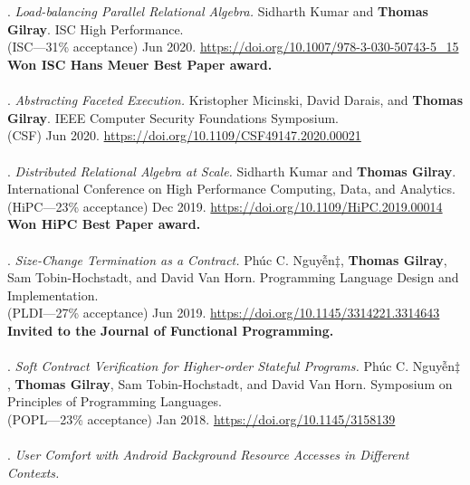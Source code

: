 \\ \vspace{-0.1cm}\\
\paper. \textit{Load-balancing Parallel Relational Algebra.}
Sidharth Kumar and \textbf{Thomas Gilray}.
ISC High Performance.
\\(ISC---31\% acceptance) Jun 2020. \url{https://doi.org/10.1007/978-3-030-50743-5_15}
\\\textbf{Won ISC Hans Meuer Best Paper award.} \\ \vspace{-0.1cm}\\
\paper. \textit{Abstracting Faceted Execution.}
Kristopher Micinski, David Darais, and \textbf{Thomas Gilray}.
IEEE Computer Security Foundations Symposium.
\\(CSF) Jun 2020. \url{https://doi.org/10.1109/CSF49147.2020.00021}
\\ \vspace{-0.1cm}\\
\paper. \textit{Distributed Relational Algebra at Scale.}
Sidharth Kumar and \textbf{Thomas Gilray}.
International Conference on High Performance Computing, Data, and Analytics.
\\(HiPC---23\% acceptance) Dec 2019. \url{https://doi.org/10.1109/HiPC.2019.00014}
\\\textbf{Won HiPC Best Paper award.} \\ \vspace{-0.1cm}\\
\paper. \textit{Size-Change Termination as a Contract.}
Phúc C. Nguyễn$\ddagger$, \textbf{Thomas Gilray}, Sam Tobin-Hochstadt, and David Van Horn.
Programming Language Design and Implementation.
\\(PLDI---27\% acceptance) Jun 2019. \url{https://doi.org/10.1145/3314221.3314643}
\\\textbf{Invited to the Journal of Functional Programming.} \\ \vspace{-0.1cm}\\
\paper. \textit{Soft Contract Verification for Higher-order Stateful Programs.}
Phúc C. Nguyễn$\ddagger$, \textbf{Thomas Gilray}, Sam Tobin-Hochstadt, and David Van Horn.
Symposium on Principles of Programming Languages.
\\(POPL---23\% acceptance) Jan 2018. \url{https://doi.org/10.1145/3158139}
\\ \vspace{-0.1cm}\\
\paper. \textit{User Comfort with Android Background Resource Accesses in Different Contexts.}
